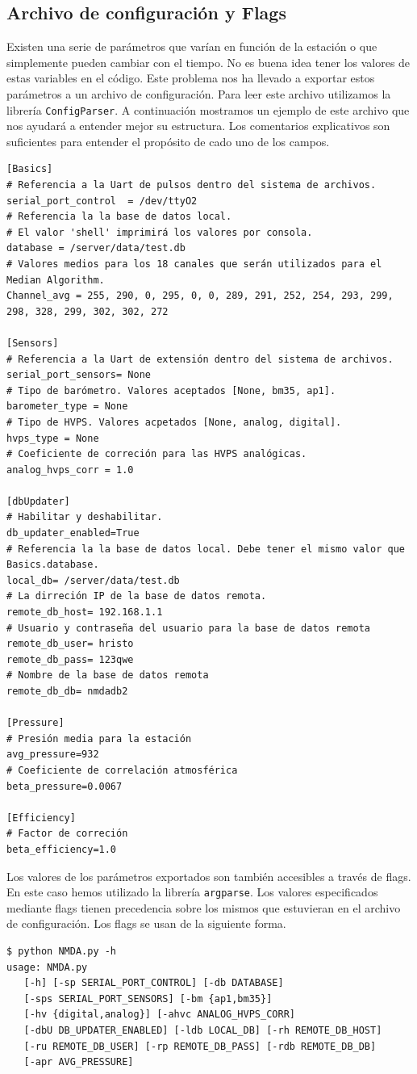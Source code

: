 	\subsection{Archivo de configuración y Flags}
		Existen una serie de parámetros que varían en función de la estación o que simplemente pueden cambiar con el tiempo. No es buena idea
		tener los valores de estas variables en el código. Este problema nos ha llevado a exportar estos parámetros a un archivo de
		configuración. Para leer este archivo utilizamos la librería \texttt{ConfigParser}\cite{py_ConfigParser}. A continuación mostramos un
		ejemplo de este archivo que nos ayudará a entender mejor su estructura. Los comentarios explicativos son suficientes para entender el
		propósito de cado uno de los campos.
		\begin{lstlisting}[style=myFile]
[Basics]
# Referencia a la Uart de pulsos dentro del sistema de archivos.
serial_port_control  = /dev/ttyO2
# Referencia la la base de datos local.
# El valor 'shell' imprimirá los valores por consola.
database = /server/data/test.db
# Valores medios para los 18 canales que serán utilizados para el Median Algorithm.
Channel_avg = 255, 290, 0, 295, 0, 0, 289, 291, 252, 254, 293, 299, 298, 328, 299, 302, 302, 272

[Sensors]
# Referencia a la Uart de extensión dentro del sistema de archivos.
serial_port_sensors= None
# Tipo de barómetro. Valores aceptados [None, bm35, ap1].
barometer_type = None
# Tipo de HVPS. Valores acpetados [None, analog, digital].
hvps_type = None
# Coeficiente de correción para las HVPS analógicas.
analog_hvps_corr = 1.0

[dbUpdater]
# Habilitar y deshabilitar.
db_updater_enabled=True
# Referencia la la base de datos local. Debe tener el mismo valor que Basics.database.
local_db= /server/data/test.db 
# La dirreción IP de la base de datos remota.
remote_db_host= 192.168.1.1
# Usuario y contraseña del usuario para la base de datos remota
remote_db_user= hristo
remote_db_pass= 123qwe
# Nombre de la base de datos remota
remote_db_db= nmdadb2

[Pressure]
# Presión media para la estación
avg_pressure=932
# Coeficiente de correlación atmosférica
beta_pressure=0.0067

[Efficiency]
# Factor de correción
beta_efficiency=1.0
\end{lstlisting} 
		\par
		Los valores de los parámetros exportados son también accesibles a través de flags. En este caso hemos utilizado la librería
		\texttt{argparse}\cite{py_argparse}. Los valores especificados mediante flags tienen precedencia sobre los mismos que estuvieran en el
		archivo de configuración. Los flags se usan de la siguiente forma.
		\begin{lstlisting}[style=myBash]
$ python NMDA.py -h
usage: NMDA.py 
   [-h] [-sp SERIAL_PORT_CONTROL] [-db DATABASE]
   [-sps SERIAL_PORT_SENSORS] [-bm {ap1,bm35}]
   [-hv {digital,analog}] [-ahvc ANALOG_HVPS_CORR]
   [-dbU DB_UPDATER_ENABLED] [-ldb LOCAL_DB] [-rh REMOTE_DB_HOST]
   [-ru REMOTE_DB_USER] [-rp REMOTE_DB_PASS] [-rdb REMOTE_DB_DB]
   [-apr AVG_PRESSURE]
		\end{lstlisting}

